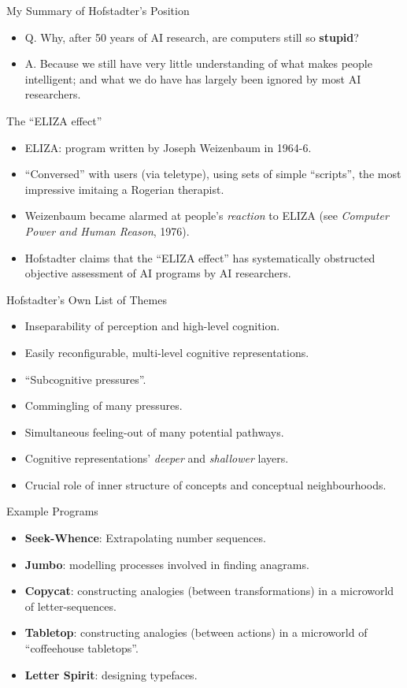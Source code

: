 \documentclass{article}
\begin{document}
\begin{slide}{}
{\Large My Summary of Hofstadter's Position}
\begin{itemize}
\item Q. Why, after 50 years of AI research, are computers still so
{\bf stupid}?
\item A. Because we still have very little understanding of what makes
people intelligent; and what we do have has largely been ignored by
most AI researchers.
\end{itemize}
\end{slide}

\begin{slide}{}
{\Large The ``ELIZA effect''}
\begin{itemize}
\item ELIZA: program written by Joseph Weizenbaum in 1964-6.
\item ``Conversed'' with users (via teletype), using sets of simple
``scripts'', the most impressive imitaing a Rogerian therapist.
\item Weizenbaum became alarmed at people's {\em reaction} to ELIZA
(see {\em Computer Power and Human Reason}, 1976).
\item Hofstadter claims that the ``ELIZA effect'' has systematically
obstructed objective assessment of AI programs by AI researchers.
\end{itemize}
\end{slide}

\begin{slide}{}
{\Large Hofstadter's Own List of Themes}
\begin{itemize}
\item Inseparability of perception and high-level cognition.
\item Easily reconfigurable, multi-level cognitive representations.
\item ``Subcognitive pressures''.
\item Commingling of many pressures.
\item Simultaneous feeling-out of many potential pathways.
\item Cognitive representations' {\em deeper} and {\em shallower} layers.
\item Crucial role of inner structure of concepts and conceptual
neighbourhoods.
\end{itemize}
\end{slide}

\begin{slide}{}
{\Large Example Programs}
\begin{itemize}
\item {\bf Seek-Whence}: Extrapolating number sequences.
\item {\bf Jumbo}: modelling processes involved in finding anagrams.
\item {\bf Copycat}: constructing analogies
(between transformations)
in a microworld of letter-sequences.
\item {\bf Tabletop}: constructing analogies (between actions) in a
microworld of ``coffeehouse tabletops''.
\item {\bf Letter Spirit}: designing typefaces. 
\end{itemize}
\end{slide}
\end{document}
